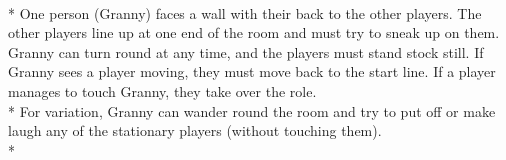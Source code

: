 \begin{minipage}{\textwidth}
\\*
One person (Granny) faces a wall with their back to the other players.  The other players line up at one end of the room and must try to sneak up on them.  Granny can turn round at any time, and the players must stand stock still. If Granny sees a player moving, they must move back to the start line.  If a player manages to touch Granny, they take over the role.\\*
For variation, Granny can wander round the room and try to put off or make laugh any of the stationary players (without touching them).\\*
\end{minipage}    \vfill
